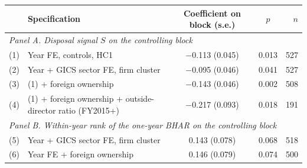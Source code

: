 \begin{tabular}{l>{\raggedright\arraybackslash}p{6.4cm}ccr}
\toprule
 & Specification & Coefficient on block (s.e.) & $p$ & $n$ \\
\midrule
\multicolumn{5}{l}{\emph{Panel A. Disposal signal $S$ on the controlling block}} \\
(1) & Year FE, controls, HC1 & $-$0.113 (0.045) & 0.013 & 527 \\
(2) & Year + GICS sector FE, firm cluster & $-$0.095 (0.046) & 0.041 & 527 \\
(3) & (1) + foreign ownership & $-$0.143 (0.046) & 0.002 & 508 \\
(4) & (1) + foreign ownership + outside-director ratio (FY2015+) & $-$0.217 (0.093) & 0.018 & 191 \\
\midrule
\multicolumn{5}{l}{\emph{Panel B. Within-year rank of the one-year BHAR on the controlling block}} \\
(5) & Year + GICS sector FE, firm cluster & 0.143 (0.078) & 0.068 & 518 \\
(6) & Year FE + foreign ownership & 0.146 (0.079) & 0.074 & 500 \\
\bottomrule
\end{tabular}
